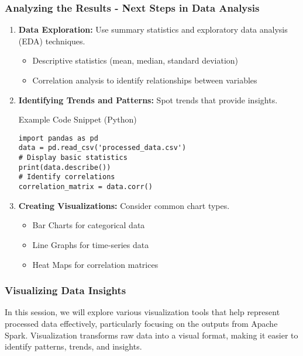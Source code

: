 \documentclass[aspectratio=169]{beamer}
\begin{document}
\begin{frame}[fragile]
    \frametitle{Analyzing the Results - Next Steps in Data Analysis}
    \begin{enumerate}
        \item \textbf{Data Exploration:} Use summary statistics and exploratory data analysis (EDA) techniques.
            \begin{itemize}
                \item Descriptive statistics (mean, median, standard deviation)
                \item Correlation analysis to identify relationships between variables
            \end{itemize}
            
        \item \textbf{Identifying Trends and Patterns:} Spot trends that provide insights.
            \begin{block}{Example Code Snippet (Python)}
            \begin{lstlisting}
import pandas as pd
data = pd.read_csv('processed_data.csv')
# Display basic statistics
print(data.describe())
# Identify correlations
correlation_matrix = data.corr()
            \end{lstlisting}
            \end{block}
        
        \item \textbf{Creating Visualizations:} Consider common chart types. 
            \begin{itemize}
                \item Bar Charts for categorical data
                \item Line Graphs for time-series data
                \item Heat Maps for correlation matrices
            \end{itemize}
    \end{enumerate}
\end{frame}

\begin{frame}[fragile]
    \frametitle{Visualizing Data Insights}
    In this session, we will explore various visualization tools that help represent processed data effectively, particularly focusing on the outputs from Apache Spark. Visualization transforms raw data into a visual format, making it easier to identify patterns, trends, and insights.
\end{frame}
\end{document}
